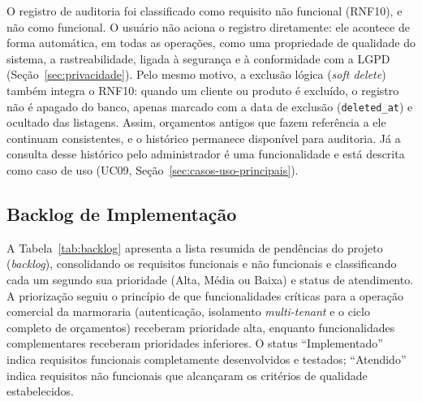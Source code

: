 O registro de auditoria foi classificado como requisito não funcional (RNF10), e não como funcional. O usuário não aciona o registro diretamente: ele acontece de forma automática, em todas as operações, como uma propriedade de qualidade do sistema, a rastreabilidade, ligada à segurança e à conformidade com a LGPD (Seção~\ref{sec:privacidade}). Pelo mesmo motivo, a exclusão lógica (\textit{soft delete}) também integra o RNF10: quando um cliente ou produto é excluído, o registro não é apagado do banco, apenas marcado com a data de exclusão (\texttt{deleted\_at}) e ocultado das listagens. Assim, orçamentos antigos que fazem referência a ele continuam consistentes, e o histórico permanece disponível para auditoria. Já a consulta desse histórico pelo administrador é uma funcionalidade e está descrita como caso de uso (UC09, Seção~\ref{sec:casos-uso-principais}).

\subsection{Backlog de Implementação}
\label{sec:backlog-implementacao}

A Tabela~\ref{tab:backlog} apresenta a lista resumida de pendências do projeto (\textit{backlog}), consolidando os requisitos funcionais e não funcionais e classificando cada um segundo sua prioridade (Alta, Média ou Baixa) e status de atendimento. A priorização seguiu o princípio de que funcionalidades críticas para a operação comercial da marmoraria (autenticação, isolamento \textit{multi-tenant} e o ciclo completo de orçamentos) receberam prioridade alta, enquanto funcionalidades complementares receberam prioridades inferiores. O status ``Implementado'' indica requisitos funcionais completamente desenvolvidos e testados; ``Atendido'' indica requisitos não funcionais que alcançaram os critérios de qualidade estabelecidos.

